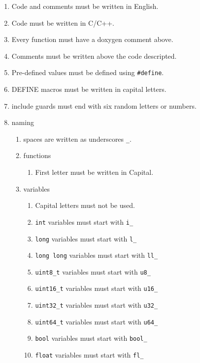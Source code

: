 \begin{enumerate}
    \item Code and comments must be written in English.
    \item Code must be written in C/C++.
    \item Every function must have a doxygen comment above.
    \item Comments must be written above the code descripted.
    \item Pre-defined values must be defined using \lstinline{#define}.
    \item DEFINE macros must be written in capital letters.
    \item include guards must end with six random letters or numbers.
    \item naming
    \begin{enumerate}[label=\arabic*.]
        \item spaces are written as underscores \lstinline{_}.
        \item functions
        \begin{enumerate}[label=\arabic*.]
            \item First letter must be written in Capital.
        \end{enumerate}
        \item variables
        \begin{enumerate}[label=\arabic*.]
            \item Capital letters must not be used.
            \item \lstinline{int} variables must start with \lstinline{i_}
            \item \lstinline{long} variables must start with \lstinline{l_}
            \item \lstinline{long long} variables must start with \lstinline{ll_}
            \item \lstinline{uint8_t} variables must start with \lstinline{u8_}
            \item \lstinline{uint16_t} variables must start with \lstinline{u16_}
            \item \lstinline{uint32_t} variables must start with \lstinline{u32_}
            \item \lstinline{uint64_t} variables must start with \lstinline{u64_}
            \item \lstinline{bool} variables must start with \lstinline{bool_}
            \item \lstinline{float} variables must start with \lstinline{fl_}

\end{enumerate}
\end{enumerate}
\end{enumerate}
